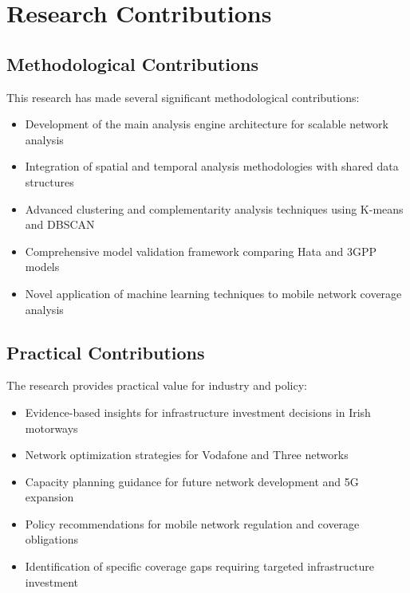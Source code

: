 \documentclass[MScCS]{uccthesis}
\begin{document}
\section{Research Contributions}

\subsection{Methodological Contributions}
This research has made several significant methodological contributions:
\begin{itemize}
\item Development of the main analysis engine architecture for scalable network analysis
\item Integration of spatial and temporal analysis methodologies with shared data structures
\item Advanced clustering and complementarity analysis techniques using K-means and DBSCAN
\item Comprehensive model validation framework comparing Hata and 3GPP models
\item Novel application of machine learning techniques to mobile network coverage analysis
\end{itemize}

\subsection{Practical Contributions}
The research provides practical value for industry and policy:
\begin{itemize}
\item Evidence-based insights for infrastructure investment decisions in Irish motorways
\item Network optimization strategies for Vodafone and Three networks
\item Capacity planning guidance for future network development and 5G expansion
\item Policy recommendations for mobile network regulation and coverage obligations
\item Identification of specific coverage gaps requiring targeted infrastructure investment
\end{itemize}
\end{document}
